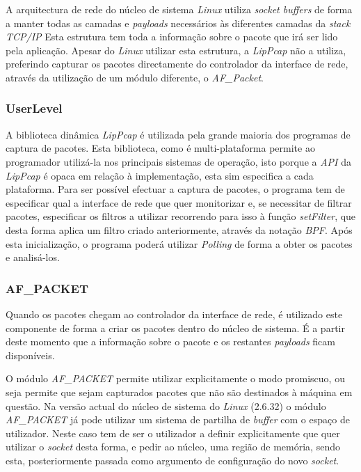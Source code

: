 A arquitectura de rede do núcleo de sistema \textit{Linux} utiliza \textit{socket buffers} de forma a manter todas as camadas e \textit{payloads} necessários às diferentes camadas da \textit{stack TCP/IP}
Esta estrutura tem toda a informação sobre o pacote que irá ser lido pela aplicação.
Apesar do \textit{Linux} utilizar esta estrutura, a \textit{LipPcap} não a utiliza, preferindo capturar os pacotes directamente do controlador da interface de rede, através da utilização de um módulo diferente, o \textit{AF\_Packet}.

\subsubsection{UserLevel}

A biblioteca dinâmica \textit{LipPcap} é utilizada pela grande maioria dos programas de captura de pacotes.
Esta biblioteca, como é multi-plataforma permite ao programador utilizá-la nos principais sistemas de operação, isto porque a \textit{API} da \textit{LipPcap} é opaca em relação à implementação, esta sim especifica a cada plataforma.
Para ser possível efectuar a captura de pacotes, o programa tem de especificar qual a interface de rede que quer monitorizar e, se necessitar de filtrar pacotes, especificar os filtros a utilizar recorrendo para isso à função \textit{setFilter}, que desta forma aplica um filtro criado anteriormente, através da notação \textit{BPF}.
Após esta inicialização, o programa poderá utilizar \textit{Polling} de forma a obter os pacotes e analisá-los.

\subsubsection{AF\_PACKET}

Quando os pacotes chegam ao controlador da interface de rede, é utilizado este componente de forma a criar os pacotes dentro do núcleo de sistema. 
É a partir deste momento que a informação sobre o pacote e os restantes \textit{payloads} ficam disponíveis.

O módulo \textit{AF\_PACKET} permite utilizar explicitamente o modo promiscuo, ou seja permite que sejam capturados pacotes que não são destinados à máquina em questão.
Na versão actual do núcleo de sistema do \textit{Linux} (2.6.32) o módulo \textit{AF\_PACKET} já pode utilizar um sistema de partilha de \textit{buffer} com o espaço de utilizador.
Neste caso tem de ser o utilizador a definir explicitamente que quer utilizar o \textit{socket} desta forma, e pedir ao núcleo, uma região de memória, sendo esta, posteriormente passada como argumento de configuração do novo \textit{socket}.

